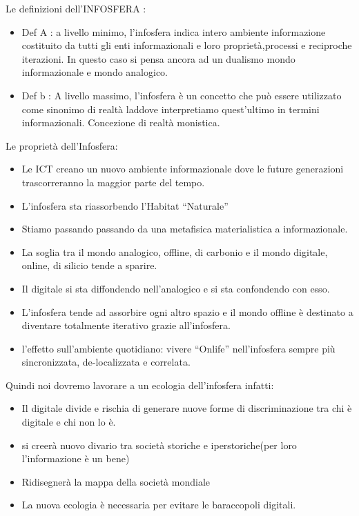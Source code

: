 \documentclass[a4page, 11pt]{article}
\begin{document}
Le definizioni dell'INFOSFERA :

\begin{itemize}
	 
	\item
	Def A : a livello minimo, l'infosfera indica intero ambiente
	informazione costituito da tutti gli enti informazionali e loro
	proprietà,processi e reciproche iterazioni.
	In questo caso si pensa ancora ad un dualismo mondo informazionale
	e mondo analogico.
	\item
	Def b : A livello massimo, l'infosfera è un concetto che può essere
	utilizzato come sinonimo di realtà laddove interpretiamo quest'ultimo
	in termini informazionali. Concezione di realtà monistica.
\end{itemize}

Le proprietà dell'Infosfera:

\begin{itemize}
	 
	\item
	Le ICT creano un nuovo ambiente informazionale dove le future
	generazioni trascorreranno la maggior parte del tempo.
	\item
	L'infosfera sta riassorbendo l'Habitat ``Naturale''
	\item
	Stiamo passando passando da una metafisica materialistica a
	informazionale.
	\item
	La soglia tra il mondo analogico, offline, di carbonio e il mondo
	digitale, online, di silicio tende a sparire.
	\item
	Il digitale si sta diffondendo nell'analogico e si sta confondendo con
	esso.
	\item
	L'infosfera tende ad assorbire ogni altro spazio e il mondo offline è
	destinato a diventare totalmente iterativo grazie all'infosfera.
	\item
	l'effetto sull'ambiente quotidiano: vivere ``Onlife'' nell'infosfera
	sempre più sincronizzata, de-localizzata e correlata.
\end{itemize}

Quindi noi dovremo lavorare a un ecologia dell'infosfera infatti:

\begin{itemize}
	 
	\item
	Il digitale divide e rischia di generare nuove forme di
	discriminazione tra chi è digitale e chi non lo è.
	\item
	si creerà nuovo divario tra società storiche e iperstoriche(per loro
	l'informazione è un bene)
	\item
	Ridisegnerà la mappa della società mondiale
	\item
	La nuova ecologia è necessaria per evitare le baraccopoli digitali.
\end{itemize}
\end{document}
